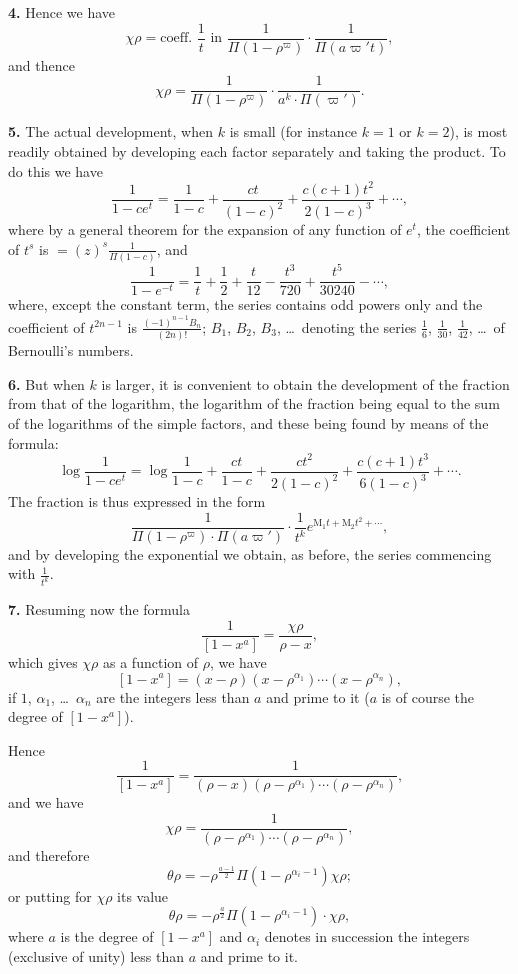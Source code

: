 \documentclass[11pt,a4paper]{book}
\begin{document}
\begin{center}
\medskip
\noindent\textbf{4.} Hence we have
\[\chi \rho = \text{coeff. } \frac{1}{t} \text{ in } \frac{1}{\Pi(1-\rho^{\varpi})} \cdot \frac{1}{\Pi(a\varpi' t)},\]
and thence
\[\chi \rho = \frac{1}{\Pi(1-\rho^{\varpi})} \cdot \frac{1}{a^k \cdot \Pi(\varpi')}.\]

\medskip
\noindent\textbf{5.} The actual development, when $k$ is small (for instance $k=1$ or $k=2$), is most readily obtained by developing each factor separately and taking the product. To do this we have
\[\frac{1}{1-ce^t} = \frac{1}{1-c} + \frac{ct}{(1-c)^2} + \frac{c(c+1)t^2}{2(1-c)^3} + \cdots,\]
where by a general theorem for the expansion of any function of $e^t$, the coefficient of $t^s$ is $=(z)^s \frac{1}{\Pi(1-c)}$, and
\[\frac{1}{1-e^{-t}} = \frac{1}{t} + \frac{1}{2} + \frac{t}{12} - \frac{t^3}{720} + \frac{t^5}{30240} - \cdots,\]
where, except the constant term, the series contains odd powers only and the coefficient of $t^{2n-1}$ is $\frac{(-1)^{n-1}B_n}{(2n)!}$; $B_1$, $B_2$, $B_3$, \ldots\ denoting the series $\frac{1}{6}$, $\frac{1}{30}$, $\frac{1}{42}$, \ldots\ of Bernoulli's numbers.

\medskip
\noindent\textbf{6.} But when $k$ is larger, it is convenient to obtain the development of the fraction from that of the logarithm, the logarithm of the fraction being equal to the sum of the logarithms of the simple factors, and these being found by means of the formula:
\[\log \frac{1}{1-ce^t} = \log \frac{1}{1-c} + \frac{ct}{1-c} + \frac{ct^2}{2(1-c)^2} + \frac{c(c+1)t^3}{6(1-c)^3} + \cdots.\]
The fraction is thus expressed in the form
\[\frac{1}{\Pi(1-\rho^{\varpi}) \cdot \Pi(a\varpi')} \cdot \frac{1}{t^k} e^{\mathrm{M}_1 t + \mathrm{M}_2 t^2 + \cdots},\]
and by developing the exponential we obtain, as before, the series commencing with $\frac{1}{t^k}$.

\newpage

\medskip
\noindent\textbf{7.} Resuming now the formula
\[\frac{1}{[1-x^a]} = \frac{\chi \rho}{\rho - x},\]
which gives $\chi \rho$ as a function of $\rho$, we have
\[[1-x^a] = (x-\rho)(x-\rho^{\alpha_1})\cdots(x-\rho^{\alpha_n}),\]
if $1$, $\alpha_1$, \ldots\ $\alpha_n$ are the integers less than $a$ and prime to it ($a$ is of course the degree of $[1-x^a]$).

Hence
\[\frac{1}{[1-x^a]} = \frac{1}{(\rho-x)(\rho-\rho^{\alpha_1})\cdots(\rho-\rho^{\alpha_n})},\]
and we have
\[\chi \rho = \frac{1}{(\rho-\rho^{\alpha_1})\cdots(\rho-\rho^{\alpha_n})},\]
and therefore
\[\theta \rho = -\rho^{\frac{a-1}{2}} \Pi(1-\rho^{\alpha_i-1}) \chi \rho;\]
or putting for $\chi \rho$ its value
\[\theta \rho = -\rho^{\frac{a}{2}} \Pi(1-\rho^{\alpha_i-1}) \cdot \chi \rho,\]
where $a$ is the degree of $[1-x^a]$ and $\alpha_i$ denotes in succession the integers (exclusive of unity) less than $a$ and prime to it.


\end{center}
\end{document}
